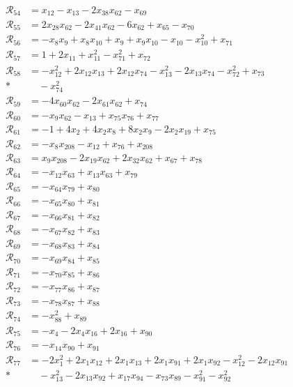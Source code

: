 \begin{align*}
\mathcal R_{54} &= x_{12} -x_{13} -2x_{38}x_{62} -x_{69} \\
\mathcal R_{55} &= 2x_{28}x_{62} -2x_{41}x_{62} -6x_{62} +x_{65} -x_{70} \\
\mathcal R_{56} &= -x_{8}x_{9} +x_{8}x_{10} +x_{9} +x_{9}x_{10} -x_{10} -x_{10}^{2} +x_{71} \\
\mathcal R_{57} &= 1 +2x_{11} +x_{11}^{2} -x_{71}^{2} +x_{72} \\
\mathcal R_{58} &= -x_{12}^{2} +2x_{12}x_{13} +2x_{12}x_{74} -x_{13}^{2} -2x_{13}x_{74} -x_{72}^{2} +x_{73} \\*
&\quad -x_{74}^{2} \\
\mathcal R_{59} &= -4x_{60}x_{62} -2x_{61}x_{62} +x_{74} \\
\mathcal R_{60} &= -x_{9}x_{62} -x_{13} +x_{75}x_{76} +x_{77} \\
\mathcal R_{61} &= -1 +4x_{2} +4x_{2}x_{8} +8x_{2}x_{9} -2x_{2}x_{19} +x_{75} \\
\mathcal R_{62} &= -x_{8}x_{208} -x_{12} +x_{76} +x_{208} \\
\mathcal R_{63} &= x_{9}x_{208} -2x_{19}x_{62} +2x_{32}x_{62} +x_{67} +x_{78} \\
\mathcal R_{64} &= -x_{12}x_{63} +x_{13}x_{63} +x_{79} \\
\mathcal R_{65} &= -x_{64}x_{79} +x_{80} \\
\mathcal R_{66} &= -x_{65}x_{80} +x_{81} \\
\mathcal R_{67} &= -x_{66}x_{81} +x_{82} \\
\mathcal R_{68} &= -x_{67}x_{82} +x_{83} \\
\mathcal R_{69} &= -x_{68}x_{83} +x_{84} \\
\mathcal R_{70} &= -x_{69}x_{84} +x_{85} \\
\mathcal R_{71} &= -x_{70}x_{85} +x_{86} \\
\mathcal R_{72} &= -x_{77}x_{86} +x_{87} \\
\mathcal R_{73} &= -x_{78}x_{87} +x_{88} \\
\mathcal R_{74} &= -x_{88}^{2} +x_{89} \\
\mathcal R_{75} &= -x_{4} -2x_{4}x_{16} +2x_{16} +x_{90} \\
\mathcal R_{76} &= -x_{14}x_{90} +x_{91} \\
\mathcal R_{77} &= -2x_{1}^{2} +2x_{1}x_{12} +2x_{1}x_{13} +2x_{1}x_{91} +2x_{1}x_{92} -x_{12}^{2} -2x_{12}x_{91} \\*
&\quad -x_{13}^{2} -2x_{13}x_{92} +x_{17}x_{94} -x_{73}x_{89} -x_{91}^{2} -x_{92}^{2} \\

\end{align*}
